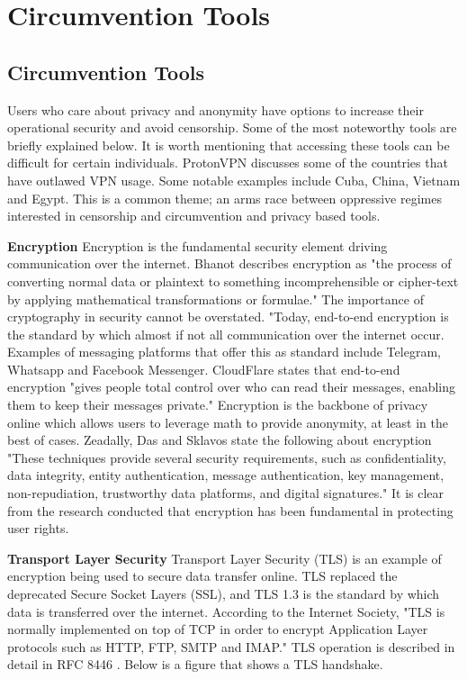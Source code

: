 \chapter{Circumvention Tools}
\section{Circumvention Tools}
Users who care about privacy and anonymity have options to increase their operational security and avoid censorship. Some of the most noteworthy tools are briefly explained below. It is worth mentioning that accessing these tools can be difficult for certain individuals. ProtonVPN discusses some of the countries that have outlawed VPN usage. \cite{protonvpn_vpn_legality_2} Some notable examples include Cuba, China, Vietnam and Egypt. This is a common theme; an arms race between oppressive regimes interested in censorship and circumvention and privacy based tools.

\textbf{Encryption}
Encryption is the fundamental security element driving communication over the internet. Bhanot describes encryption as "the process of converting normal data or plaintext to something incomprehensible or cipher-text by applying mathematical transformations or formulae." \cite{bhanot2015review} The importance of cryptography in security cannot be overstated. "Today, end-to-end encryption is the standard by which almost if not all communication over the internet occur. Examples of messaging platforms that offer this as standard include Telegram, Whatsapp and Facebook Messenger. CloudFlare states that end-to-end encryption "gives people total control over who can read their messages, enabling them to keep their messages private." \cite{cloudflare_e2ee} Encryption is the backbone of privacy online which allows users to leverage math to provide anonymity, at least in the best of cases. Zeadally, Das and Sklavos state the following about encryption "These techniques provide several security requirements, such as confidentiality, data integrity, entity authentication, message authentication, key management, non-repudiation, trustworthy data platforms, and digital signatures." \cite{ZEADALLY2021100075} It is clear from the research conducted that encryption has been fundamental in protecting user rights. 

\textbf{Transport Layer Security}
Transport Layer Security (TLS) is an example of encryption being used to secure data transfer online. TLS replaced the deprecated Secure Socket Layers (SSL), and TLS 1.3 is the standard by which data is transferred over the internet. According to the Internet Society, "TLS is normally implemented on top of TCP in order to encrypt Application Layer protocols such as HTTP, FTP, SMTP and IMAP." \cite{internetsociety_tls_basics} TLS operation is described in detail in RFC 8446 \cite{rfc8446} \cite{cloudflare_tls_handshake}. Below is a figure that shows a TLS handshake.

